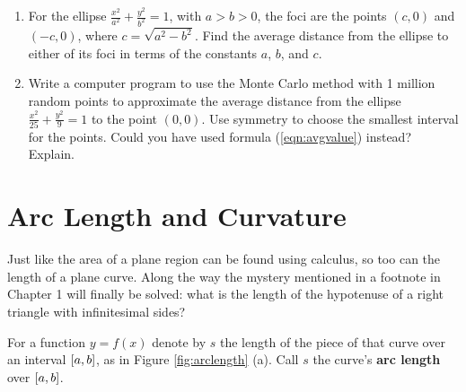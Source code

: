 {\begin{enumerate}[\bfseries 1.]
\begin{enumerate}[\bfseries (a)]
\[
E_\sigma(t) ~=~ \nu \Omega^2 R^2\,\sin^2\,(\Omega t + \phi) ~.
\]
Show that the average energy $\avg{E_\sigma}$ over one period
$\ival{0}{2\pi/\Omega}$ of oscillation is
\[
\avg{E_\sigma} ~=~ \frac{1}{2}\nu \Omega^2 R^2 ~.
\]
  \end{enumerate}
[{[\bfseries 1.]}]
 \item For the ellipse $\frac{x^2}{a^2} + \frac{y^2}{b^2} = 1$, with $a > b > 0$,
  the foci are the points $(c,0)$ and $(-c,0)$, where $c = \sqrt{a^2 - b^2}$.
  Find the average distance from the ellipse to either of its foci in terms of
  the constants $a$, $b$, and $c$.
 \item Write a computer program to use the Monte Carlo method with 1 million
  random points to approximate the average distance from the ellipse
  $\frac{x^2}{25} + \frac{y^2}{9} = 1$ to the point $(0,0)$. Use symmetry to
  choose the smallest interval for the points. Could you have used formula
  (\ref{eqn:avgvalue}) instead? Explain.
\end{enumerate}
}
\newpage
\section{Arc Length and Curvature}
Just like the area of a plane region can be found using calculus, so too can the
length of a plane curve. Along the way the mystery mentioned in a footnote in
Chapter 1 will finally be solved: what is the length of the hypotenuse of a
right triangle with infinitesimal sides?

For a function $y=f(x)$ denote by $s$ the length of the piece of that curve over
an interval $\lbrack a,b \rbrack$, as in Figure \ref{fig:arclength} (a). Call $s$ the
curve's \textbf{arc length} over $\lbrack a,b \rbrack$. 


